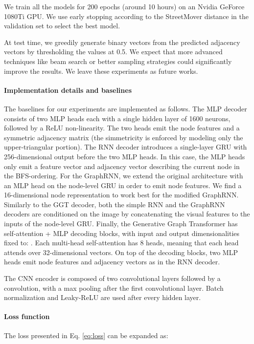 \documentclass{article}
\begin{document}
We train all the models for 200 epochs (around 10 hours) on an Nvidia GeForce 1080Ti GPU. We use early stopping according to the StreetMover distance in the validation set to select the best model.

At test time, we greedily generate binary vectors from the predicted adjacency vectors  by thresholding the values at 0.5. We expect that more advanced techniques like beam search or better sampling strategies \citep{lin2018neural} could significantly improve the results. We leave these experiments as future works.

\paragraph{Implementation details and baselines}
The baselines for our experiments are implemented as follows. The MLP decoder consists of two MLP heads each with a single hidden layer of 1600 neurons, followed by a ReLU non-linearity. The two heads emit the node features  and a symmetric adjacency matrix  (the simmetricity is enforced by modeling only the upper-triangular portion). The RNN decoder introduces a single-layer GRU \citep{chung2014empirical} with 256-dimensional output before the two MLP heads. In this case, the MLP heads only emit a feature vector and adjacency vector describing the current node in the BFS-ordering. For the GraphRNN, we extend the original architecture with an MLP head on the node-level GRU in order to emit node features. We find a 16-dimensional node representation to work best for the modified GraphRNN. Similarly to the GGT decoder, both the simple RNN and the GraphRNN decoders are conditioned on the image  by concatenating the visual features  to the inputs of the node-level GRU. Finally, the Generative Graph Transformer has  self-attention + MLP decoding blocks, with input and output dimensionalities fixed to: . Each multi-head self-attention has 8 heads, meaning that each head attends over 32-dimensional vectors. On top of the decoding blocks, two MLP heads emit node features and adjacency vectors as in the RNN decoder.

The CNN encoder is composed of two  convolutional layers followed by a  convolution, with a  max pooling after the first convolutional layer. Batch normalization and Leaky-ReLU are used after every hidden layer.

\paragraph{Loss function} The loss presented in Eq. \ref{eq:loss} can be expanded as:
\end{document}
